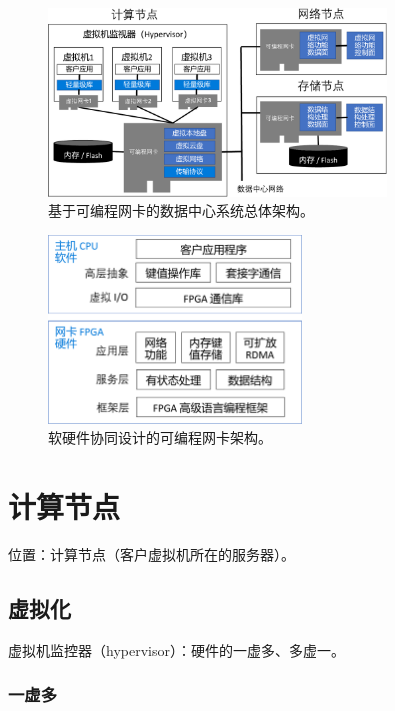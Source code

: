 \begin{figure}[htbp]
	\centering
	\includegraphics[width=0.8\textwidth]{figures/accel_arch.pdf}
	\caption{基于可编程网卡的数据中心系统总体架构。}
	\label{arch:fig:accel-arch}
\end{figure}



\begin{figure}[htbp]
	\centering
	\includegraphics[width=0.6\textwidth]{figures/sw_hw_codesign.pdf}
	\caption{软硬件协同设计的可编程网卡架构。}
	\label{arch:fig:sw-hw-codesign}
\end{figure}

\section{计算节点}

位置：计算节点（客户虚拟机所在的服务器）。

\subsection{虚拟化}

虚拟机监控器（hypervisor）：硬件的一虚多、多虚一。

\subsubsection{一虚多}

